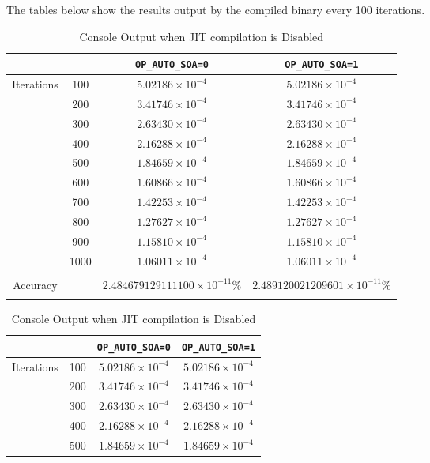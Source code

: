\noindent The tables below show the results output by the compiled binary every 100 iterations.
\begin{table}[H]
\renewcommand{\arraystretch}{1.2}
\caption{Console Output when JIT compilation is Enabled}
\label{tab:output}
\begin{tabular}{c c || c | c }
&  & \verb|OP_AUTO_SOA=0| & \verb|OP_AUTO_SOA=1| \\
\hline
\multirow{10}{*}{Iterations} & 100  & $ 5.02186\times10^{-4} $ & $ 5.02186\times10^{-4} $  \\
& 200  & $ 3.41746\times10^{-4} $ & $ 3.41746\times10^{-4} $  \\
& 300  & $ 2.63430\times10^{-4} $ & $ 2.63430\times10^{-4} $  \\
& 400  & $ 2.16288\times10^{-4} $ & $ 2.16288\times10^{-4} $  \\
& 500  & $ 1.84659\times10^{-4} $ & $ 1.84659\times10^{-4} $  \\
& 600  & $ 1.60866\times10^{-4} $ & $ 1.60866\times10^{-4} $  \\
& 700  & $ 1.42253\times10^{-4} $ & $ 1.42253\times10^{-4} $  \\
& 800  & $ 1.27627\times10^{-4} $ & $ 1.27627\times10^{-4} $  \\
& 900  & $ 1.15810\times10^{-4} $ & $ 1.15810\times10^{-4} $  \\
& 1000  & $ 1.06011\times10^{-4} $ & $ 1.06011\times10^{-4} $  \\
\hline
&&&\\
Accuracy & & $2.484679129111100\times10^{-11} \%$ & $2.489120021209601\times10^{-11} \%$ \\
&&&\\
\hline
\end{tabular}
\newline
\newline
\caption{Console Output when JIT compilation is Disabled}
\label{tab:output}
\begin{tabular}{c c || c | c }
&  & \verb|OP_AUTO_SOA=0| & \verb|OP_AUTO_SOA=1| \\
\hline
\multirow{10}{*}{Iterations} & 100  & $ 5.02186\times10^{-4} $ & $ 5.02186\times10^{-4} $  \\
& 200  & $ 3.41746\times10^{-4} $ & $ 3.41746\times10^{-4} $  \\
& 300  & $ 2.63430\times10^{-4} $ & $ 2.63430\times10^{-4} $  \\
& 400  & $ 2.16288\times10^{-4} $ & $ 2.16288\times10^{-4} $  \\
& 500  & $ 1.84659\times10^{-4} $ & $ 1.84659\times10^{-4} $  \\

\end{tabular}
\end{table}
